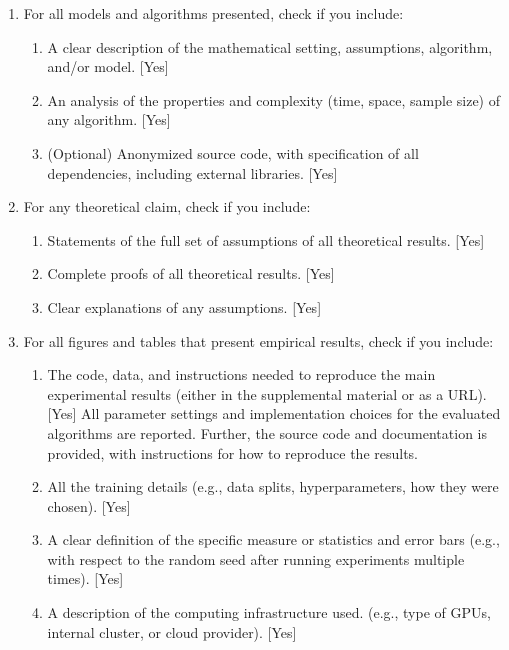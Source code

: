 \documentclass[twoside]{article}
\begin{document}
 \begin{enumerate}


 \item For all models and algorithms presented, check if you include:
 \begin{enumerate}
   \item A clear description of the mathematical setting, assumptions, algorithm, and/or model. [Yes]
   \item An analysis of the properties and complexity (time, space, sample size) of any algorithm. [Yes]
   \item (Optional) Anonymized source code, with specification of all dependencies, including external libraries. [Yes]
   
 \end{enumerate}


 \item For any theoretical claim, check if you include:
 \begin{enumerate}
   \item Statements of the full set of assumptions of all theoretical results. [Yes]
   \item Complete proofs of all theoretical results. [Yes]
   \item Clear explanations of any assumptions. [Yes]     
 \end{enumerate}


 \item For all figures and tables that present empirical results, check if you include:
 \begin{enumerate}
   \item The code, data, and instructions needed to reproduce the main experimental results (either in the supplemental material or as a URL). [Yes]
    \newline
    All parameter settings and implementation choices for the evaluated algorithms are reported. Further, the source code and documentation is provided, with instructions for how to reproduce the results.  
   \item All the training details (e.g., data splits, hyperparameters, how they were chosen). [Yes]
         \item A clear definition of the specific measure or statistics and error bars (e.g., with respect to the random seed after running experiments multiple times). [Yes]
         \item A description of the computing infrastructure used. (e.g., type of GPUs, internal cluster, or cloud provider). [Yes]
 \end{enumerate}


\end{enumerate}
\end{document}
